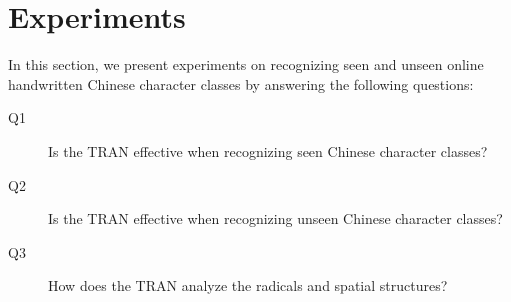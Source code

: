 \documentclass[a4paper,conference]{IEEEtran}
\begin{document}
\section{Experiments}
\label{sec:Experiments}
In this section, we present experiments on recognizing seen and unseen online handwritten Chinese character classes by answering the following questions:
\begin{description}
    \item[Q1] Is the TRAN effective when recognizing seen Chinese character classes?
    \item[Q2] Is the TRAN effective when recognizing unseen Chinese character classes?
    \item[Q3] How does the TRAN analyze the radicals and spatial structures?
\end{description}
\end{document}

